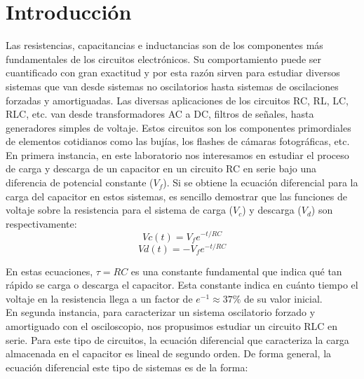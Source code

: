 \documentclass[%
 reprint,
 amsmath,amssymb,
 aps,
]{revtex4-1}
\begin{document}

\section{\label{sec:level1}Introducci\'on}

Las resistencias, capacitancias e inductancias son de los componentes m\'as fundamentales de los circuitos electr\'onicos. Su comportamiento puede ser cuantificado con gran exactitud y por esta raz\'on sirven para estudiar diversos sistemas que van desde sistemas no oscilatorios hasta sistemas de oscilaciones forzadas y amortiguadas. Las diversas aplicaciones de los circuitos RC, RL, LC, RLC, etc. van desde transformadores AC a DC, filtros de señales, hasta generadores simples de voltaje. Estos circuitos son los componentes primordiales de elementos cotidianos como las buj\'ias, los flashes de c\'amaras fotogr\'aficas, etc.\\

En primera instancia, en este laboratorio nos interesamos en estudiar el proceso de carga y descarga de un capacitor en un circuito RC en serie bajo una diferencia de potencial constante ($V_f$). Si se obtiene la ecuación diferencial para la carga del capacitor en estos sistemas, es sencillo demostrar que las funciones de voltaje sobre la resistencia para el sistema de carga ($V_c$) y descarga ($V_d$) son respectivamente:\\

\begin{equation}
Vc(t) = V_fe^{-t/{RC}}
\end{equation}
\begin{equation}
Vd(t) = -V_fe^{-t/{RC}}
\end{equation}

En estas ecuaciones, $\tau = RC$ es una constante fundamental que indica qu\'e tan r\'apido se carga o descarga el capacitor. Esta constante indica en cu\'anto tiempo el voltaje en la resistencia llega a un factor de $e^{-1} \approx 37\% $ de su valor inicial. \\

En segunda instancia, para caracterizar un sistema oscilatorio forzado y amortiguado con el osciloscopio, nos propusimos estudiar un circuito RLC en serie. Para este tipo de circuitos, la ecuaci\'on diferencial que caracteriza la carga almacenada en el capacitor es lineal de segundo orden. De forma general, la ecuación diferencial este tipo de sistemas es de la forma:\\
\end{document}
